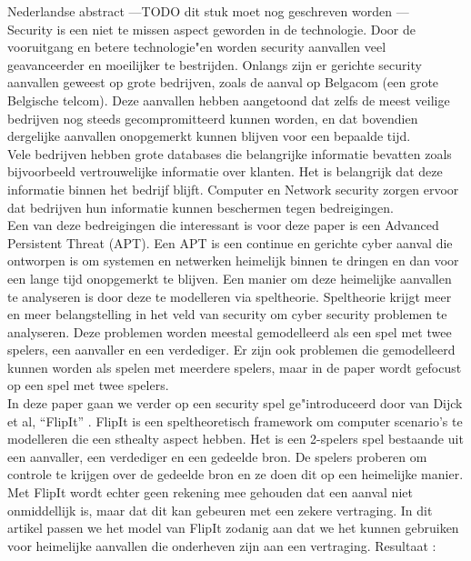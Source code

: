 \documentclass[master=cws, masteroption=vs,english]{kulemt}
\begin{document}
\begin{abstract*}
Nederlandse abstract
---TODO dit stuk moet nog geschreven worden --- \\

Security is een niet te missen aspect geworden in de technologie. Door de vooruitgang en betere technologie"en worden security aanvallen veel geavanceerder en moeilijker te bestrijden. Onlangs zijn er gerichte security aanvallen geweest op grote bedrijven, zoals de aanval op Belgacom (een grote Belgische telcom). Deze aanvallen hebben aangetoond dat zelfs de meest veilige
bedrijven nog steeds gecompromitteerd kunnen worden, en dat bovendien dergelijke aanvallen onopgemerkt kunnen blijven voor een bepaalde tijd. \\

Vele bedrijven hebben grote databases die belangrijke informatie bevatten zoals bijvoorbeeld vertrouwelijke informatie over klanten. Het is belangrijk dat deze informatie binnen het bedrijf blijft. Computer en Network security zorgen ervoor dat bedrijven hun informatie kunnen beschermen tegen bedreigingen. \\
Een van deze bedreigingen die interessant is voor deze paper is een Advanced Persistent Threat (APT). Een APT is een continue en gerichte cyber aanval die ontworpen is om systemen en netwerken heimelijk binnen te dringen en dan voor een lange tijd onopgemerkt te blijven. Een manier om deze heimelijke aanvallen te analyseren is door deze te modelleren via speltheorie. Speltheorie krijgt meer en meer belangstelling in het veld van security om cyber security problemen te analyseren. Deze problemen worden meestal gemodelleerd als een spel met twee spelers, een aanvaller en een verdediger. Er zijn ook problemen die gemodelleerd kunnen worden als spelen met meerdere spelers, maar in de paper wordt gefocust op een spel met twee spelers. \\

In deze paper gaan we verder op een security spel ge"introduceerd door van Dijck et al, ``FlipIt'' \citep{FlipIt}.
FlipIt is een speltheoretisch framework om computer scenario's te modelleren die een sthealty aspect hebben. Het is een 2-spelers spel bestaande uit een aanvaller, een verdediger en een gedeelde bron.  De spelers proberen om controle te krijgen over de gedeelde bron en ze
doen dit op een heimelijke manier. Met FlipIt wordt echter geen rekening mee gehouden dat een aanval niet onmiddellijk is, maar dat dit kan gebeuren met een zekere vertraging. In dit artikel passen we het model van FlipIt zodanig aan dat we het kunnen gebruiken voor heimelijke aanvallen die onderheven zijn aan een vertraging.
Resultaat : \\


\end{abstract*}
\end{document}
